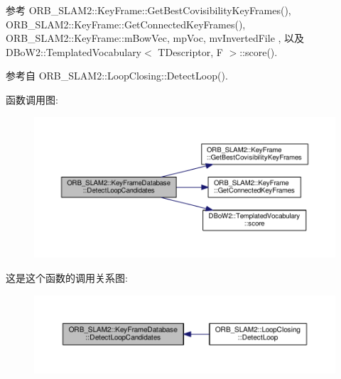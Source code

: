 参考 O\-R\-B\-\_\-\-S\-L\-A\-M2\-::\-Key\-Frame\-::\-Get\-Best\-Covisibility\-Key\-Frames(), O\-R\-B\-\_\-\-S\-L\-A\-M2\-::\-Key\-Frame\-::\-Get\-Connected\-Key\-Frames(), O\-R\-B\-\_\-\-S\-L\-A\-M2\-::\-Key\-Frame\-::m\-Bow\-Vec, mp\-Voc, mv\-Inverted\-File , 以及 D\-Bo\-W2\-::\-Templated\-Vocabulary$<$ T\-Descriptor, F $>$\-::score().



参考自 O\-R\-B\-\_\-\-S\-L\-A\-M2\-::\-Loop\-Closing\-::\-Detect\-Loop().



函数调用图\-:
\nopagebreak
\begin{figure}[H]
\begin{center}
\leavevmode
\includegraphics[width=350pt]{classORB__SLAM2_1_1KeyFrameDatabase_a2d396aae02c4318ea8c7e7eff8059c69_cgraph}
\end{center}
\end{figure}




这是这个函数的调用关系图\-:
\nopagebreak
\begin{figure}[H]
\begin{center}
\leavevmode
\includegraphics[width=350pt]{classORB__SLAM2_1_1KeyFrameDatabase_a2d396aae02c4318ea8c7e7eff8059c69_icgraph}
\end{center}
\end{figure}


